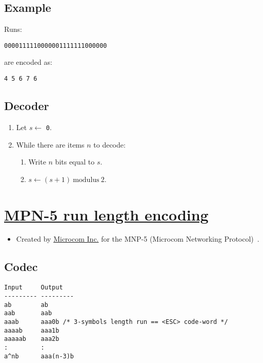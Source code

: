 \subsection{Example}

Runs:

\begin{verbatim}
0000111110000001111111000000
\end{verbatim}

are encoded as:

\begin{verbatim}
4 5 6 7 6
\end{verbatim}

\subsection{Decoder}

\begin{enumerate}
\tightlist
\item Let \(s\leftarrow\) \texttt{0}.
\item While there are items \(n\) to decode:
  \tightlist
  \begin{enumerate}
  \tightlist
  \item Write \(n\) bits equal to \(s\).
  \item \(s\leftarrow (s+1)~\text{modulus}~2\).
  \end{enumerate}
\end{enumerate}

\section{\href{https://en.wikipedia.org/wiki/Microcom_Networking_Protocol\#MNP_5}{MPN-5 run length encoding}}

\begin{itemize}
\tightlist
\item Created by
  \href{https://en.wikipedia.org/wiki/Microcom_Networking_Protocol}{Microcom
  Inc.} for the MNP-5 (Microcom Networking Protocol)~\cite{held1991data}.
\end{itemize}

\subsection{Codec}

\begin{verbatim}
Input     Output
--------- ---------
ab        ab
aab       aab
aaab      aaa0b /* 3-symbols length run == <ESC> code-word */
aaaab     aaa1b
aaaaab    aaa2b
:         :
a^nb      aaa(n-3)b
\end{verbatim}


